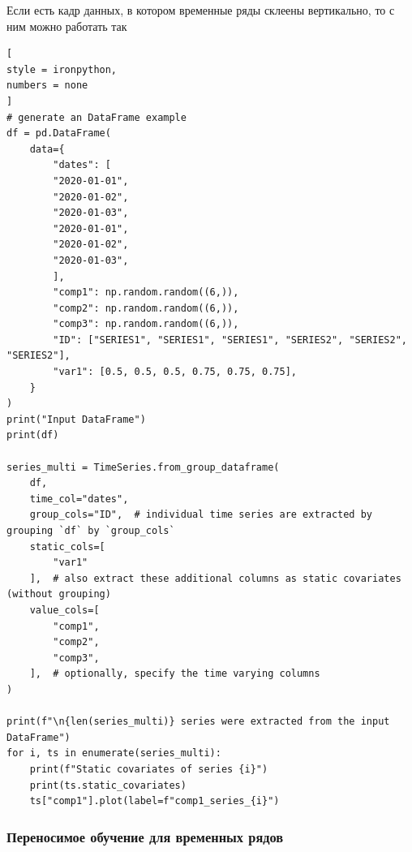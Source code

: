 \documentclass[%
	11pt,
	a4paper,
	utf8,
		]{article}
\begin{document}
Если есть кадр данных, в котором временные ряды склеены вертикально, то с ним можно работать так
\begin{lstlisting}[
style = ironpython,
numbers = none
]
# generate an DataFrame example
df = pd.DataFrame(
	data={
		"dates": [
		"2020-01-01",
		"2020-01-02",
		"2020-01-03",
		"2020-01-01",
		"2020-01-02",
		"2020-01-03",
		],
		"comp1": np.random.random((6,)),
		"comp2": np.random.random((6,)),
		"comp3": np.random.random((6,)),
		"ID": ["SERIES1", "SERIES1", "SERIES1", "SERIES2", "SERIES2", "SERIES2"],
		"var1": [0.5, 0.5, 0.5, 0.75, 0.75, 0.75],
	}
)
print("Input DataFrame")
print(df)

series_multi = TimeSeries.from_group_dataframe(
	df,
	time_col="dates",
	group_cols="ID",  # individual time series are extracted by grouping `df` by `group_cols`
	static_cols=[
		"var1"
	],  # also extract these additional columns as static covariates (without grouping)
	value_cols=[
		"comp1",
		"comp2",
		"comp3",
	],  # optionally, specify the time varying columns
)

print(f"\n{len(series_multi)} series were extracted from the input DataFrame")
for i, ts in enumerate(series_multi):
	print(f"Static covariates of series {i}")
	print(ts.static_covariates)
	ts["comp1"].plot(label=f"comp1_series_{i}")
\end{lstlisting}

\subsubsection{Переносимое обучение для временных рядов}
\end{document}
